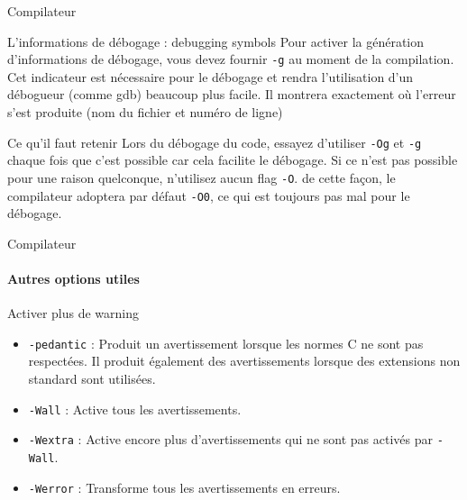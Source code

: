 \begin{frame}{Compilateur}
	\begin{block}{L'informations de débogage : debugging symbols}
		Pour activer la génération \alert{d'informations de débogage}, vous devez fournir \alert{\texttt{-g}} au moment de la compilation. Cet indicateur est nécessaire pour le débogage et rendra l'utilisation d'un débogueur (comme gdb) beaucoup plus facile. Il montrera exactement où l'erreur s'est produite (nom du fichier et numéro de ligne)
	\end{block}
	\begin{alertblock}{Ce qu'il faut retenir}
		Lors du \alert{débogage} du code, essayez d'utiliser \texttt{-Og} et \texttt{-g} chaque fois que c'est possible car cela facilite le débogage. Si ce n'est pas possible pour une raison quelconque, n'utilisez aucun flag \texttt{-O}. de cette façon, le compilateur adoptera par défaut \texttt{-O0}, ce qui est toujours pas mal pour le débogage.
	\end{alertblock}
\end{frame}

\begin{frame}{Compilateur}
	\framesubtitle{Autres options utiles}
	\begin{block}{Activer plus de warning}
		\begin{itemize}
			\item \alert{\texttt{-pedantic}} : Produit un avertissement lorsque les normes C ne sont pas respectées. Il produit également des avertissements lorsque des extensions non standard sont utilisées.
			\item \alert{\texttt{-Wall}} : Active tous les avertissements.
			\item \alert{\texttt{-Wextra}} : Active encore plus d'avertissements qui ne sont pas activés par \alert{\texttt{-Wall}}.
			\item \alert{\texttt{-Werror}} : Transforme tous les avertissements en erreurs.
		\end{itemize}
	\end{block}
\end{frame}

